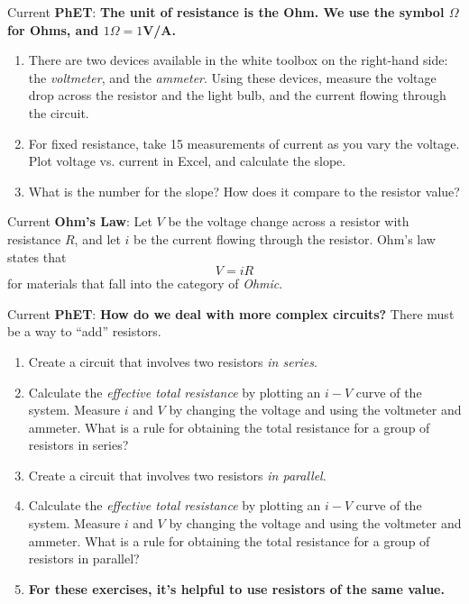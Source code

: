 \documentclass{beamer}
\begin{document}
\begin{frame}{Current}
\textbf{\alert{PhET}}: \textbf{The unit of resistance is the Ohm.  We use the symbol $\Omega$ for Ohms, and $1\Omega = 1$V/A.}
\begin{enumerate}
\item There are two devices available in the white toolbox on the right-hand side: the \textit{voltmeter}, and the \textit{ammeter}.  Using these devices, measure the voltage drop across the resistor and the light bulb, and the current flowing through the circuit.
\item For fixed resistance, take 15 measurements of current as you vary the voltage.  Plot voltage vs. current in Excel, and calculate the slope.
\item What is the number for the slope?  How does it compare to the resistor value?
\end{enumerate}
\end{frame}

\begin{frame}{Current}
\textbf{Ohm's Law}: Let $V$ be the voltage change across a resistor with resistance $R$, and let $i$ be the current flowing through the resistor.  Ohm's law states that
\begin{equation}
\boxed{
V = iR}
\end{equation}
for materials that fall into the category of \textit{Ohmic}.
\end{frame}

\begin{frame}{Current}
\small
\textbf{\alert{PhET}}: \textbf{How do we deal with more complex circuits?} There must be a way to ``add'' resistors.
\begin{enumerate}
\item Create a circuit that involves two resistors \textit{in series}.
\item Calculate the \textit{effective total resistance} by plotting an $i-V$ curve of the system.  Measure $i$ and $V$ by changing the voltage and using the voltmeter and ammeter.  What is a rule for obtaining the total resistance for a group of resistors in series?
\item Create a circuit that involves two resistors \textit{in parallel}.
\item Calculate the \textit{effective total resistance} by plotting an $i-V$ curve of the system.  Measure $i$ and $V$ by changing the voltage and using the voltmeter and ammeter.   What is a rule for obtaining the total resistance for a group of resistors in parallel?
\item \textbf{For these exercises, it's helpful to use resistors of the same value.}
\end{enumerate}
\end{frame}
\end{document}
